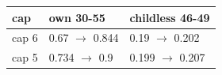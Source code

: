 \begingroup\small
\setlength{\tabcolsep}{3pt}
\renewcommand{\arraystretch}{1.04}
\begin{tabularx}{\linewidth}{XXX}
\toprule
cap & own 30-55 & childless 46-49 \\
\midrule
cap 6 & 0.67 $\to$ 0.844 & 0.19 $\to$ 0.202 \\
cap 5 & 0.734 $\to$ 0.9 & 0.199 $\to$ 0.207 \\
\bottomrule
\end{tabularx}
\endgroup
